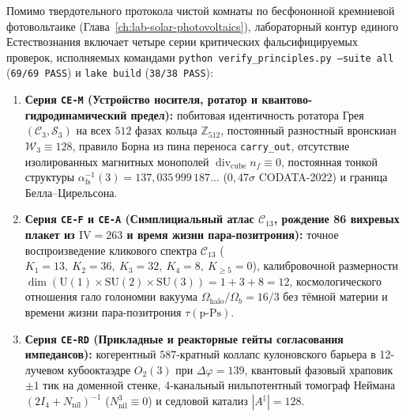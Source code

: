 Помимо твердотельного протокола чистой комнаты по бесфононной кремниевой фотовольтаике (Глава~\ref{ch:lab-solar-photovoltaics}), лабораторный контур единого Естествознания включает четыре серии критических фальсифицируемых проверок, исполняемых командами \texttt{python verify\_principles.py --suite all} (\texttt{69/69 PASS}) и \texttt{lake build} (\texttt{38/38 PASS}):
\begin{enumerate}[label=\textbf{Серия~\arabic*.},leftmargin=*]
\item \textbf{Серия \texttt{CE-M} (Устройство носителя, ротатор и квантово-гидродинамический предел):}
  побитовая идентичность ротатора Грея $(\mathcal{C}_3,\mathcal{S}_3)$ на всех $512$ фазах кольца $\mathbb{Z}_{512}$, постоянный разностный вронскиан $\mathcal{W}_3 \equiv 128$, правило Борна из пина переноса \texttt{carry\_out}, отсутствие изолированных магнитных монополей $\operatorname{div}_{\mathrm{cube}} n_f \equiv 0$, постоянная тонкой структуры $\alpha_{\mathrm{fs}}^{-1}(3) = 137{,}035\,999\,187\dots$ ($0{,}47\sigma$ CODATA-2022) и граница Белла--Цирельсона.
\item \textbf{Серия \texttt{CE-F} и \texttt{CE-A} (Симплициальный атлас $\mathcal{C}_{13}$, рождение 86 вихревых плакет из $\mathrm{IV}=263$ и время жизни пара-позитрония):}
  точное воспроизведение кликового спектра $\mathcal{C}_{13}$ ($K_1=13,\ K_2=36,\ K_3=32,\ K_4=8,\ K_{\ge 5}=0$), калибровочной размерности $\dim(\mathrm{U}(1)\times\mathrm{SU}(2)\times\mathrm{SU}(3)) = 1 + 3 + 8 = 12$, космологического отношения гало голономии вакуума $\Omega_{\mathrm{halo}}/\Omega_b = 16/3$ без тёмной материи и времени жизни пара-позитрония $\tau(\text{p-Ps})$.
\item \textbf{Серия \texttt{CE-RD} (Прикладные и реакторные гейты согласования импедансов):}
  когерентный $587$-кратный коллапс кулоновского барьера в 12-лучевом кубооктаэдре $O_2(3)$ при $\Delta\varphi = 139$, квантовый фазовый храповик $\pm 1$ тик на доменной стенке, 4-канальный нильпотентный томограф Неймана $(2I_4 + N_{\mathrm{nil}})^{-1}$ ($N_{\mathrm{nil}}^3 \equiv 0$) и седловой катализ $|A^\ddagger| = 128$.
\end{enumerate}



